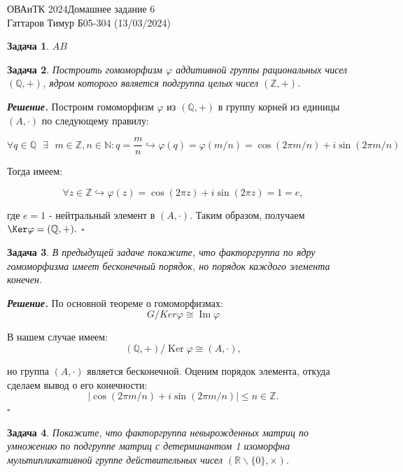 \documentclass[12pt]{article}
\newtheorem{problem}{Задача}
\newenvironment{solution}[1][\it{Решение}]{\textbf{#1. } }{$\square$}
\DeclareMathOperator{\Ima}{Im}
\DeclareMathOperator{\Kera}{Ker}
\begin{document}
\noindent ОВАиТК 2024\hfill Домашнее задание 6 \\
Гаттаров Тимур Б05-304 (13/03/2024)

\hrulefill

\begin{problem}
    $AB$
\end{problem}
\begin{problem}
    Построить гомоморфизм $\varphi$ аддитивной группы рациональных чисел $(\mathbb{Q},+)$, ядром которого является подгруппа целых чисел $(\mathbb{Z},+)$.
\end{problem}

\begin{solution}
    Построим гомоморфизм $\varphi$ из $(\mathbb{Q}, +)$ в группу корней из единицы $(A, \cdot)$ по следующему правилу:

    $$
    \forall q \in \mathbb{Q} \text{ } \exists \text{ } m \in \mathbb{Z}, n \in \mathbb{N} : q = \frac{m}{n} \hookrightarrow \varphi(q) = \varphi (m/n) = \cos{(2\pi m / n)} + i\sin{(2 \pi m / n)}
    $$

    Тогда имеем: 

    $$
    \forall z \in \mathbb{Z} \hookrightarrow \varphi(z) = \cos{(2\pi z)} + i\sin{(2 \pi z)} = 1 = e,
    $$

    где $e = 1$ - нейтральный элемент в $(A, \cdot)$. Таким образом, получаем $\Ker \varphi = (\mathbb{Q}, +).$
\end{solution}


\begin{problem}
    В предыдущей задаче покажите, что факторгруппа по ядру гомоморфизма имеет бесконечный порядок, но порядок каждого элемента конечен.
\end{problem}

\begin{solution}
    По основной теореме о гомоморфизмах: 
    $$
    G / Ker \varphi \cong \Ima \varphi
    $$

    В нашем случае имеем:
     $$
     (\mathbb{Q}, +) / \Kera \varphi \cong (A, \cdot),
     $$

    но группа $(A, \cdot)$ является бесконечной.
 Оценим порядок элемента, откуда сделаем вывод о его конечности:
    $$
    |\cos{(2\pi m / n)} + i\sin{(2 \pi m / n)}| \leq n \in \mathbb{Z}.
    $$
\end{solution}


\begin{problem}
     Покажите, что факторгруппа невырожденных матриц по умножению по подгруппе матриц с детерминантом 1 изоморфна мультипликативной группе действительных чисел $(\mathbb{R} \backslash\{0\}, \times)$.
\end{problem}
\end{document}
